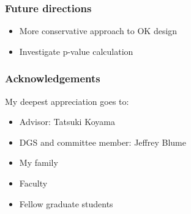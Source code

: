 \documentclass{beamer}\usepackage[]{graphicx}\usepackage[]{color}
\begin{document}
\begin{frame}
\frametitle{Future directions}
    \begin{itemize}
        \item More conservative approach to OK design
        \item Investigate p-value calculation 
    \end{itemize}
\end{frame}

\begin{frame}
\frametitle{Acknowledgements}
My deepest appreciation goes to:
    \begin{itemize}
        \item Advisor: Tatsuki Koyama
        \item DGS and committee member: Jeffrey Blume
        \item My family
        \item Faculty
        \item Fellow graduate students
    \end{itemize}
\end{frame}
\end{document}
